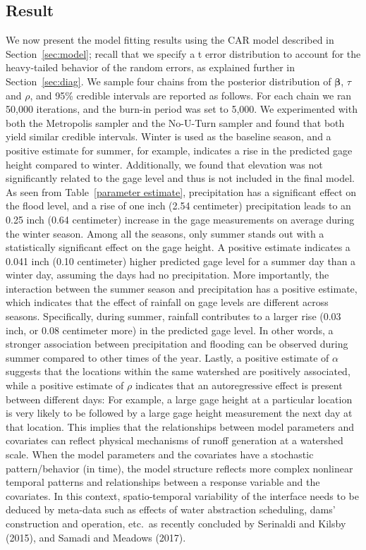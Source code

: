 \documentclass{svjour3}
\renewcommand\hl[1]{#1}
\begin{document}
\subsection{Result}\label{subsec:reported_result}
We now present the model fitting results using the CAR model described in Section~\ref{sec:model}; recall that we specify a t error distribution to account for the heavy-tailed behavior of the random errors, as explained further in Section~\ref{sec:diag}.
We sample four chains from the posterior distribution of $\boldsymbol{\beta}$, $\tau$ and $\rho$, and 95\% credible intervals are reported as follows.
For each chain we ran 50,000 iterations, and the burn-in period was set to 5,000.
We experimented with both the Metropolis sampler and the No-U-Turn sampler and found that both yield similar credible intervals.
 Winter is used as the baseline season, and a positive estimate for summer, for example, indicates a rise in the predicted gage height compared to winter.
 Additionally, we found that elevation  was not significantly related to the gage level and thus is not included in the final model. \\

As seen from Table~\ref{parameter estimate}, precipitation has a significant effect on the flood level, and a rise of one inch \hl{(2.54 centimeter)} precipitation leads to an 0.25 inch \hl{(0.64 centimeter)} increase in the gage measurements on average during the winter season.
Among all the seasons, only summer stands out with a statistically significant effect on the gage height.
A positive estimate indicates a 0.041 inch \hl{(0.10 centimeter)} higher predicted gage level for a summer day than a winter day, assuming the days had no precipitation.
More importantly, the interaction between the summer season and precipitation has a positive estimate, which indicates that the effect of rainfall on gage levels are different across seasons.
Specifically, during  summer,  rainfall contributes to a larger rise (0.03 inch, or  \hl{0.08 centimeter} more) in the predicted gage level.
In other words, a stronger association between precipitation and flooding can be observed during summer compared to other times of the year.
 Lastly, a positive estimate of $ \alpha$ suggests that the locations within the same watershed are positively associated, while a positive estimate of $ \rho$ indicates that an autoregressive effect is present between different days: For example, a large gage height at a particular location is very likely to be followed by a large gage height measurement the next day at that location.
This implies that the relationships between model parameters and covariates can reflect physical mechanisms of runoff generation at a watershed scale.
When the model parameters and the covariates have a stochastic pattern/behavior (in time), the model structure reflects more complex nonlinear temporal patterns and relationships between a response variable and the covariates.
In this context, spatio-temporal variability of the interface needs to be deduced by meta-data such as effects of water abstraction scheduling, dams' construction and operation, etc.\ as recently concluded by Serinaldi and Kilsby (2015), and Samadi and Meadows (2017).
\end{document}

